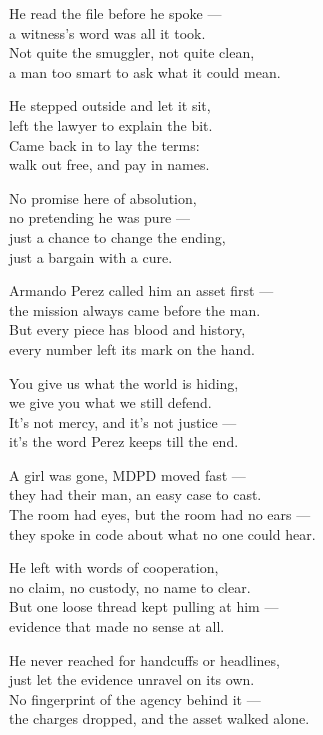 \begin{lyrics}

He read the file before he spoke —\\
a witness's word was all it took.\\
Not quite the smuggler, not quite clean,\\
a man too smart to ask what it could mean.

He stepped outside and let it sit,\\
left the lawyer to explain the bit.\\
Came back in to lay the terms:\\
walk out free, and pay in names.

No promise here of absolution,\\
no pretending he was pure —\\
just a chance to change the ending,\\
just a bargain with a cure.

Armando Perez called him an asset first —\\
the mission always came before the man.\\
But every piece has blood and history,\\
every number left its mark on the hand.

You give us what the world is hiding,\\
we give you what we still defend.\\
It's not mercy, and it's not justice —\\
it's the word Perez keeps till the end.

A girl was gone, MDPD moved fast —\\
they had their man, an easy case to cast.\\
The room had eyes, but the room had no ears —\\
they spoke in code about what no one could hear.

He left with words of cooperation,\\
no claim, no custody, no name to clear.\\
But one loose thread kept pulling at him —\\
evidence that made no sense at all.

He never reached for handcuffs or headlines,\\
just let the evidence unravel on its own.\\
No fingerprint of the agency behind it —\\
the charges dropped, and the asset walked alone.


\end{lyrics}
